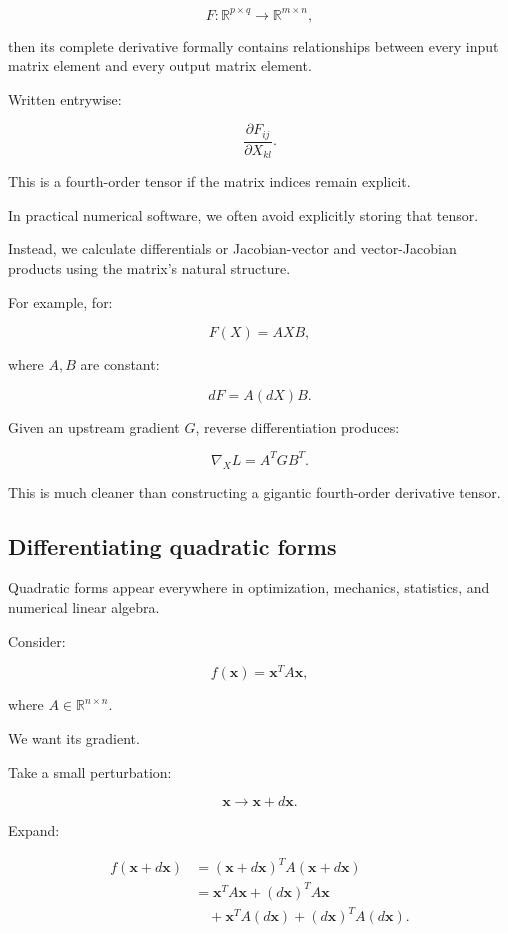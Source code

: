 \[
F:\mathbb R^{p\times q}\rightarrow\mathbb R^{m\times n},
\]

then its complete derivative formally contains relationships between every input matrix element and every output matrix element.

Written entrywise:

\[
\frac{\partial F_{ij}}{\partial X_{kl}}.
\]

This is a fourth-order tensor if the matrix indices remain explicit.

In practical numerical software, we often avoid explicitly storing that tensor.

Instead, we calculate differentials or Jacobian-vector and vector-Jacobian products using the matrix's natural structure.

For example, for:

\[
F(X)=AXB,
\]

where \(A,B\) are constant:

\[
\boxed{ dF=A(dX)B }.
\]

Given an upstream gradient \(G\), reverse differentiation produces:

\[
\boxed{ \nabla_XL=A^TGB^T }.
\]

This is much cleaner than constructing a gigantic fourth-order derivative tensor.

\subsection{Differentiating quadratic forms}\label{02-foundations-ii-ch027-differentiating-quadratic-forms}

Quadratic forms appear everywhere in optimization, mechanics, statistics, and numerical linear algebra.

Consider:

\[
f(\mathbf x)=\mathbf x^TA\mathbf x,
\]

where \(A\in\mathbb R^{n\times n}\).

We want its gradient.

Take a small perturbation:

\[
\mathbf x\longrightarrow\mathbf x+d\mathbf x.
\]

Expand:

\[
\begin{aligned} f(\mathbf x+d\mathbf x) &=(\mathbf x+d\mathbf x)^TA(\mathbf x+d\mathbf x)\\ &=\mathbf x^TA\mathbf x +(d\mathbf x)^TA\mathbf x\\ &\quad+\mathbf x^TA(d\mathbf x) +(d\mathbf x)^TA(d\mathbf x). \end{aligned}
\]

